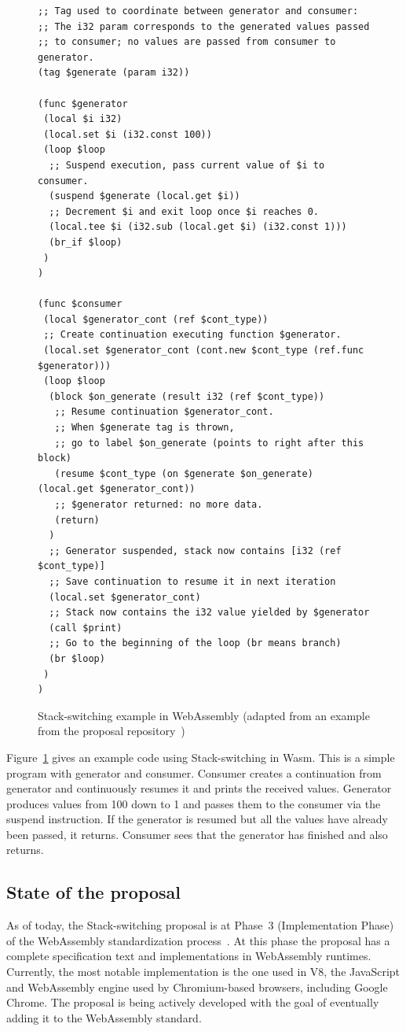 \begin{figure}[H]
    \centering
        \begin{lstlisting}[language=wasm, label={lst:wasm-example}, basicstyle=\footnotesize\ttfamily]
;; Tag used to coordinate between generator and consumer:
;; The i32 param corresponds to the generated values passed
;; to consumer; no values are passed from consumer to generator.
(tag $generate (param i32))

(func $generator
 (local $i i32)
 (local.set $i (i32.const 100))
 (loop $loop
  ;; Suspend execution, pass current value of $i to consumer.
  (suspend $generate (local.get $i))
  ;; Decrement $i and exit loop once $i reaches 0.
  (local.tee $i (i32.sub (local.get $i) (i32.const 1)))
  (br_if $loop)
 )
)

(func $consumer
 (local $generator_cont (ref $cont_type))
 ;; Create continuation executing function $generator.
 (local.set $generator_cont (cont.new $cont_type (ref.func $generator)))
 (loop $loop
  (block $on_generate (result i32 (ref $cont_type))
   ;; Resume continuation $generator_cont.
   ;; When $generate tag is thrown,
   ;; go to label $on_generate (points to right after this block)
   (resume $cont_type (on $generate $on_generate) (local.get $generator_cont))
   ;; $generator returned: no more data.
   (return)
  )
  ;; Generator suspended, stack now contains [i32 (ref $cont_type)]
  ;; Save continuation to resume it in next iteration
  (local.set $generator_cont)
  ;; Stack now contains the i32 value yielded by $generator
  (call $print)
  ;; Go to the beginning of the loop (br means branch)
  (br $loop)
 )
)
        \end{lstlisting}
    \caption{Stack-switching example in WebAssembly (adapted from an example from the proposal repository~\cite{wasm-stack-switching-example})}
    \label{fig:stack-switching-example}
\end{figure}

Figure~\ref{fig:stack-switching-example}
gives an example code using Stack-switching in Wasm. This is a simple program with generator and consumer.
Consumer creates a continuation from generator and continuously resumes it and prints the received values.
Generator produces values from 100 down to 1 and passes them to the consumer via the suspend instruction.
If the generator is resumed but all the values have already been passed, it returns. Consumer sees that
the generator has finished and also returns.

\subsection{State of the proposal}

As of today, the Stack-switching proposal is at Phase~3 (Implementation Phase) of the WebAssembly
standardization process~\cite{wasm-features}. At this phase the proposal has a complete
specification text and implementations in WebAssembly runtimes. Currently, the most notable implementation
is the one used in V8, the JavaScript and WebAssembly engine used by Chromium-based browsers, including Google Chrome. The proposal is being actively developed with the goal of
eventually adding it to the WebAssembly standard.

